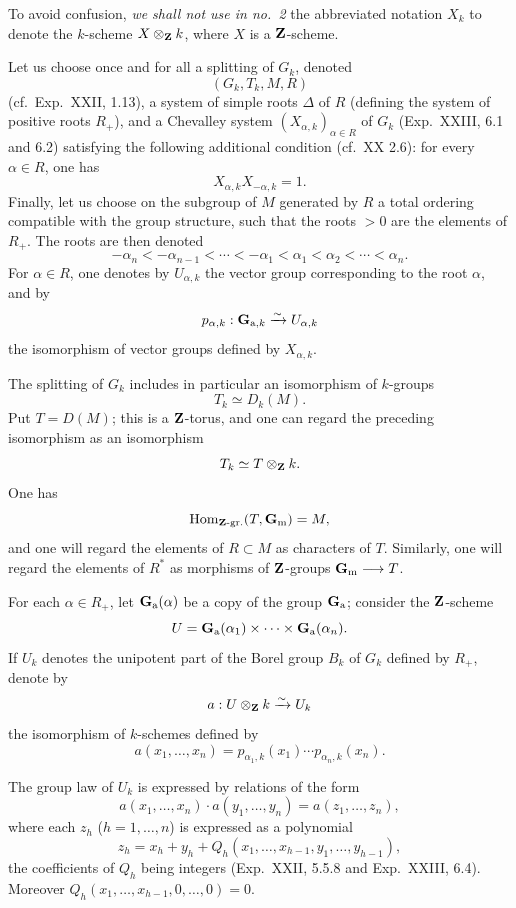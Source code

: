 To avoid confusion, \emph{we shall not use in no.~2} the abbreviated notation $X_k$ to denote the $k$-scheme $X\otimes_{\mathbf{Z}} k$, where $X$ is a $\mathbf{Z}$-scheme.

\label{XXV.2.1}
Let us choose once and for all a splitting of $G_k$, denoted
\[
(G_k,T_k,M,R)
\]
(cf.~Exp.~XXII, 1.13), a system of simple roots $\Delta$ of $R$ (defining the system of positive roots $R_+$), and a Chevalley system $(X_{\alpha,k})_{\alpha\in R}$ of $G_k$ (Exp.~XXIII, 6.1 and 6.2) satisfying the following additional condition (cf.~XX 2.6): for every $\alpha\in R$, one has
\[
X_{\alpha,k}X_{-\alpha,k}=1.
\]
Finally, let us choose on the subgroup of $M$ generated by $R$ a total ordering compatible with the group structure, such that the roots $>0$ are the elements of $R_+$. The roots are then denoted
\[
-\alpha_n<-\alpha_{n-1}<\cdots<-\alpha_1<\alpha_1<\alpha_2<\cdots<\alpha_n.
\]
For $\alpha\in R$, one denotes by $U_{\alpha,k}$ the vector group corresponding to the root $\alpha$, and by
\[
p_{\alpha,k}:\mathbf G_{\mathrm a,k}\xrightarrow{\sim} U_{\alpha,k}
\]
the isomorphism of vector groups defined by $X_{\alpha,k}$.

\label{XXV.2.2}
The splitting of $G_k$ includes in particular an isomorphism of $k$-groups
\[
T_k\simeq D_k(M).
\]
Put $T=D(M)$; this is a $\mathbf{Z}$-torus, and one can regard the preceding isomorphism as an isomorphism
\[
T_k\simeq T\otimes_{\mathbf{Z}} k.
\]
One has
\[
\operatorname{Hom}_{\mathbf{Z}\text{-gr.}}(T,\mathbf{G}_{\mathrm{m}})=M,
\]
and one will regard the elements of $R\subset M$ as characters of $T$. Similarly, one will regard the elements of $R^*$ as morphisms of $\mathbf{Z}$-groups $\mathbf{G}_{\mathrm{m}}\longrightarrow T$.

\label{XXV.2.3}
For each $\alpha\in R_+$, let $\mathbf{G}_{\mathrm{a}}(\alpha)$ be a copy of the group $\mathbf{G}_{\mathrm{a}}$; consider the $\mathbf{Z}$-scheme
\[
U=\mathbf{G}_{\mathrm{a}}(\alpha_1)\times\cdots\times\mathbf{G}_{\mathrm{a}}(\alpha_n).
\]
If $U_k$ denotes the unipotent part of the Borel group $B_k$ of $G_k$ defined by $R_+$, denote by
\[
a:U\otimes_{\mathbf{Z}} k\xrightarrow{\sim} U_k
\]
the isomorphism of $k$-schemes defined by
\[
a(x_1,\ldots,x_n)=p_{\alpha_1,k}(x_1)\cdots p_{\alpha_n,k}(x_n).
\]

\label{XXV.2.4}
The group law of $U_k$ is expressed by relations of the form
\[
a(x_1,\ldots,x_n)\cdot a(y_1,\ldots,y_n)=a(z_1,\ldots,z_n),
\]
where each $z_h$ ($h=1,\ldots,n$) is expressed as a polynomial
\[
z_h=x_h+y_h+Q_h(x_1,\ldots,x_{h-1},y_1,\ldots,y_{h-1}),
\]
the coefficients of $Q_h$ being integers (Exp.~XXII, 5.5.8 and Exp.~XXIII, 6.4). Moreover $Q_h(x_1,\ldots,x_{h-1},0,\ldots,0)=0$.

